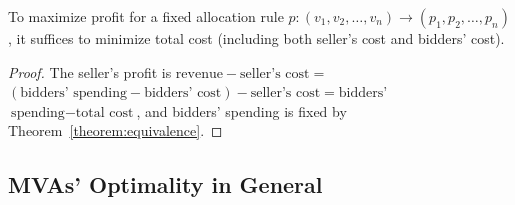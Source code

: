 \begin{corollary}
To maximize profit for a fixed allocation rule $p: (v_1, v_2, \ldots, v_n)
\rightarrow (p_1, p_2, \ldots, p_n)$, it suffices to minimize total cost
(including both seller's cost and bidders' cost).
\end{corollary}
\begin{proof}
The seller's profit is $\text{revenue} - \text{seller's cost} =$\\$
(\text{bidders' spending} - \text{bidders' cost}) - \text{seller's cost} = 
\text{bidders'}$\\$ \text{spending} - \text{total cost}$, and bidders' spending is
fixed by Theorem~\ref{theorem:equivalence}.
\end{proof}




\subsection{MVAs' Optimality in General}

